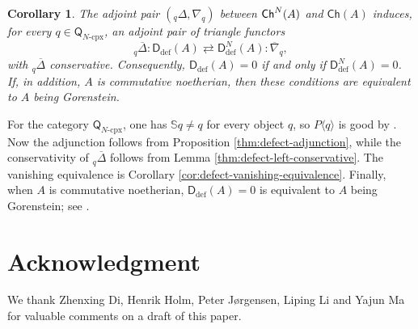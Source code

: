 \documentclass{amsart}
\theoremstyle{bfupright head,slanted body}
\theoremstyle{bfupright head,upright body}
\theoremstyle{fixed bf head,slanted body}
\newtheorem{cor}[res]{Corollary}        \newtheorem*{cor*}{Corollary}
\theoremstyle{fixed bf head,upright body}
\theoremstyle{numbered paragraph}
\newenvironment{prf*}[1][Proof]{%
	\begin{proof}[\bf #1]
		\setcounter{equation}{0}
		\renewcommand{\theequation}{\arabic{equation}}}
	{\end{proof}
}
\numberwithin{equation}{res}
\newcommand{\ch}[1]{\mathsf{Ch}(#1)}
\newcommand{\Q}{\mathsf{Q}}
\newcommand{\nablaq}{\nabla_q}
\newcommand{\DeltaLq}{{}_q\Delta}
\begin{document}
\begin{cor}\label{cor:N-complex-defect}
The adjoint pair $(\DeltaLq, \nablaq)$ between ${\sf Ch}^N(A)$ and $\ch A$ induces, for every $q\in\Q_{N\text{-}\mathrm{cpx}}$, an adjoint pair of triangle functors
$${}_q\overline{\Delta}:\mathsf D_{\mathrm{def}}(A)
\rightleftarrows \mathsf D_{\mathrm{def}}^{N}(A):\overline{\nabla}_q,$$
with ${}_q\overline{\Delta}$ conservative. Consequently, $\mathsf D_{\mathrm{def}}(A)=0$ if and only if $\mathsf D_{\mathrm{def}}^{N}(A)=0$. If, in addition, $A$ is commutative noetherian, then these conditions are equivalent to $A$ being Gorenstein.
\end{cor}

\begin{prf*}
For the category $\Q_{N\text{-}\mathrm{cpx}}$, one has $\mathbb S q\neq q$ for every object $q$, so $P\langle q\rangle$ is good by \cite[Lemma 2.7$(iii)$]{HJ26}. Now the adjunction follows from Proposition \ref{thm:defect-adjunction}, while the conservativity of ${}_q\overline{\Delta}$ follows from Lemma \ref{thm:defect-left-conservative}. The vanishing equivalence is Corollary \ref{cor:defect-vanishing-equivalence}. Finally, when $A$ is commutative noetherian, $\mathsf D_{\mathrm{def}}(A)=0$ is equivalent to $A$ being Gorenstein; see \cite[Theorem 19.5.25]{CFH24}.
\end{prf*}

\section*{Acknowledgment}
\noindent
We thank Zhenxing Di, Henrik Holm, Peter J{\o}rgensen, Liping Li and Yajun Ma for valuable comments on a draft of this paper.

\end{document}
